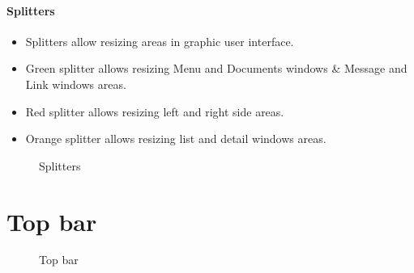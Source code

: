 \documentclass[letterpaper,10pt,english]{sphinxmanual}
\begin{document}
\paragraph{Splitters}
\begin{itemize}
\item {} 
Splitters allow resizing areas in graphic user interface.

\item {} 
Green splitter allows resizing Menu and Documents windows \& Message and Link windows areas.

\item {} 
Red splitter allows resizing left and right side areas.

\item {} 
Orange splitter allows resizing list and detail windows areas.

\end{itemize}
\begin{figure}[htbp]
\centering
\capstart

\caption{Splitters}\end{figure}
\newpage
{}

\section{Top bar}
\label{Gui:index-0}\label{Gui:gui-top-bar-label}\label{Gui::doc}\label{Gui:top-bar}\begin{figure}[htbp]
\centering
\capstart

\caption{Top bar}\end{figure}
\end{document}
